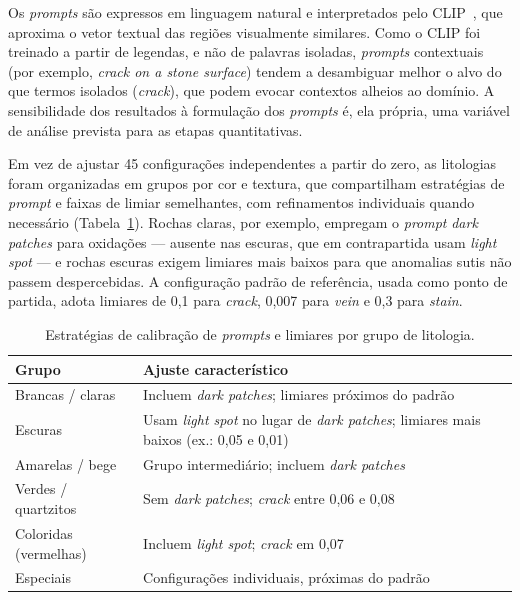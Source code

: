 \documentclass[12pt]{article}
\begin{document}
Os \textit{prompts} são expressos em linguagem natural e interpretados pelo CLIP~\cite{clip_radford2021}, que aproxima o vetor textual das regiões visualmente similares. Como o CLIP foi treinado a partir de legendas, e não de palavras isoladas, \textit{prompts} contextuais (por exemplo, \textit{crack on a stone surface}) tendem a desambiguar melhor o alvo do que termos isolados (\textit{crack}), que podem evocar contextos alheios ao domínio. A sensibilidade dos resultados à formulação dos \textit{prompts} é, ela própria, uma variável de análise prevista para as etapas quantitativas.

Em vez de ajustar 45 configurações independentes a partir do zero, as litologias foram organizadas em grupos por cor e textura, que compartilham estratégias de \textit{prompt} e faixas de limiar semelhantes, com refinamentos individuais quando necessário (Tabela~\ref{tab:calibracao}). Rochas claras, por exemplo, empregam o \textit{prompt} \textit{dark patches} para oxidações --- ausente nas escuras, que em contrapartida usam \textit{light spot} --- e rochas escuras exigem limiares mais baixos para que anomalias sutis não passem despercebidas. A configuração padrão de referência, usada como ponto de partida, adota limiares de 0,1 para \textit{crack}, 0,007 para \textit{vein} e 0,3 para \textit{stain}.

\begin{table}[ht]
\centering
\caption{Estratégias de calibração de \textit{prompts} e limiares por grupo de litologia.}
\label{tab:calibracao}
\begin{tabular}{l p{8cm}}
\hline
\textbf{Grupo} & \textbf{Ajuste característico} \\
\hline
Brancas / claras & Incluem \textit{dark patches}; limiares próximos do padrão \\
Escuras & Usam \textit{light spot} no lugar de \textit{dark patches}; limiares mais baixos (ex.: 0,05 e 0,01) \\
Amarelas / bege & Grupo intermediário; incluem \textit{dark patches} \\
Verdes / quartzitos & Sem \textit{dark patches}; \textit{crack} entre 0,06 e 0,08 \\
Coloridas (vermelhas) & Incluem \textit{light spot}; \textit{crack} em 0,07 \\
Especiais & Configurações individuais, próximas do padrão \\
\hline
\end{tabular}
\end{table}
\end{document}
